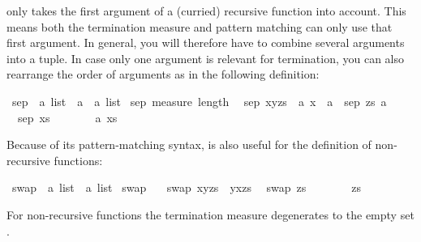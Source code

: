 \begin{isabellebody}
\begin{isamarkuptext}
\begin{warn}
   only takes the first argument of a (curried)
  recursive function into account. This means both the termination measure
  and pattern matching can only use that first argument. In general, you will
  therefore have to combine several arguments into a tuple. In case only one
  argument is relevant for termination, you can also rearrange the order of
  arguments as in the following definition:
\end{warn}%
\end{isamarkuptext}%
\ sep\ {\isacharcolon}{\isacharcolon}\ {\isachardoublequote}{\isacharprime}a\ list\ {\isasymRightarrow}\ {\isacharprime}a\ {\isasymRightarrow}\ {\isacharprime}a\ list{\isachardoublequote}\isanewline
{}\ sep\ {\isachardoublequote}measure\ length{\isachardoublequote}\isanewline
\ \ {\isachardoublequote}sep\ {\isacharparenleft}x{\isacharhash}y{\isacharhash}zs{\isacharparenright}\ {\isacharequal}\ {\isacharparenleft}{\isasymlambda}a{\isachardot}\ x\ {\isacharhash}\ a\ {\isacharhash}\ sep\ zs\ a{\isacharparenright}{\isachardoublequote}\isanewline
\ \ {\isachardoublequote}sep\ xs\ \ \ \ \ \ \ {\isacharequal}\ {\isacharparenleft}{\isasymlambda}a{\isachardot}\ xs{\isacharparenright}{\isachardoublequote}%
\begin{isamarkuptext}%
Because of its pattern-matching syntax,  is also useful
for the definition of non-recursive functions:%
\end{isamarkuptext}%
\ swap\ {\isacharcolon}{\isacharcolon}\ {\isachardoublequote}{\isacharprime}a\ list\ {\isasymRightarrow}\ {\isacharprime}a\ list{\isachardoublequote}\isanewline
{}\ swap\ {\isachardoublequote}{\isacharbraceleft}{\isacharbraceright}{\isachardoublequote}\isanewline
\ \ {\isachardoublequote}swap\ {\isacharparenleft}x{\isacharhash}y{\isacharhash}zs{\isacharparenright}\ {\isacharequal}\ y{\isacharhash}x{\isacharhash}zs{\isachardoublequote}\isanewline
\ \ {\isachardoublequote}swap\ zs\ \ \ \ \ \ \ {\isacharequal}\ zs{\isachardoublequote}%
\begin{isamarkuptext}%
\noindent
For non-recursive functions the termination measure degenerates to the empty
set \isa{{\isacharbraceleft}{\isacharbraceright}}.%
\end{isamarkuptext}%
\end{isabellebody}%
